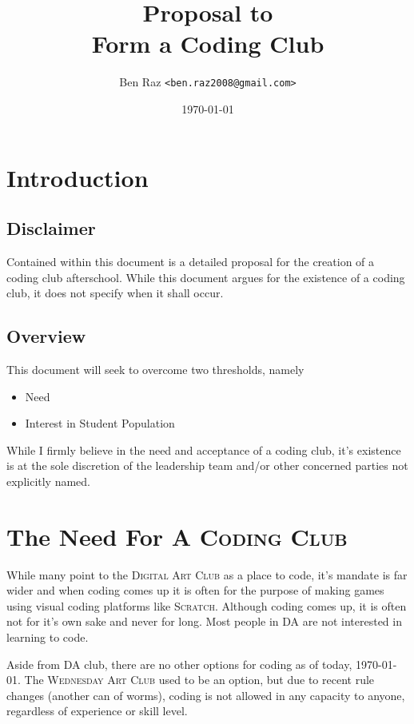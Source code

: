 \documentclass{report}
\title{\Huge{\textbf{Proposal to \\Form a Coding Club}}}
\author{Ben Raz \texttt{<ben.raz2008@gmail.com>}}
\date{\today}
\begin{document}
    \maketitle

    \section{Introduction}

        \subsection{Disclaimer}

        Contained within this document is a detailed proposal for the creation of a coding club afterschool. While this document argues for the existence of a coding club, it does not specify when it shall occur.

        \subsection{Overview}

        This document will seek to overcome two thresholds, namely

        \begin{itemize}
            \item Need
            \item Interest in Student Population
        \end{itemize}

        While I firmly believe in the need and acceptance of a coding club, it's existence is at the sole discretion of the leadership team and/or other concerned parties not explicitly named.

    \section{The Need For A \textsc{Coding Club}}

        While many point to the \textsc{Digital Art Club} as a place to code, it's mandate is far wider and when coding comes up it is often for the purpose of making games using visual coding platforms like \textsc{Scratch}. Although coding comes up, it is often not for it's own sake and never for long. Most people in DA are not interested in learning to code.

        Aside from DA club, there are no other options for coding as of today, \today. The \textsc{Wednesday Art Club} used to be an option, but due to recent rule changes (another can of worms), coding is not allowed in any capacity to anyone, regardless of experience or skill level.
\end{document}
